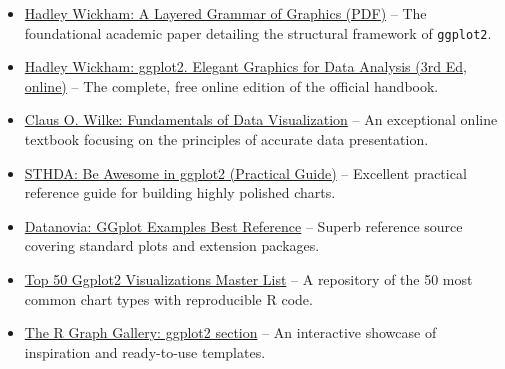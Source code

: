 \documentclass[
]{article}
\providecommand{\tightlist}{%
  \setlength{\itemsep}{0pt}\setlength{\parskip}{0pt}}
\begin{document}
\begin{itemize}
\tightlist
\item
  \href{http://byrneslab.net/classes/biol607/readings/wickham_layered-grammar.pdf}{Hadley
  Wickham: A Layered Grammar of Graphics (PDF)} -- The foundational
  academic paper detailing the structural framework of \texttt{ggplot2}.
\item
  \href{https://ggplot2-book.org/}{Hadley Wickham: ggplot2. Elegant
  Graphics for Data Analysis (3rd Ed, online)} -- The complete, free
  online edition of the official handbook.
\item
  \href{https://clauswilke.com/dataviz/}{Claus O. Wilke: Fundamentals of
  Data Visualization} -- An exceptional online textbook focusing on the
  principles of accurate data presentation.
\item
  \href{http://www.sthda.com/english/wiki/be-awesome-in-ggplot2-a-practical-guide-to-be-highly-effective-r-software-and-data-visualization}{STHDA:
  Be Awesome in ggplot2 (Practical Guide)} -- Excellent practical
  reference guide for building highly polished charts.
\item
  \href{https://www.datanovia.com/en/blog/ggplot-examples-best-reference/}{Datanovia:
  GGplot Examples Best Reference} -- Superb reference source covering
  standard plots and extension packages.
\item
  \href{http://r-statistics.co/Top50-Ggplot2-Visualizations-MasterList-R-Code.html}{Top
  50 Ggplot2 Visualizations Master List} -- A repository of the 50 most
  common chart types with reproducible R code.
\item
  \href{https://r-graph-gallery.com/ggplot2-package.html}{The R Graph
  Gallery: ggplot2 section} -- An interactive showcase of inspiration
  and ready-to-use templates.
\end{itemize}
\end{document}
